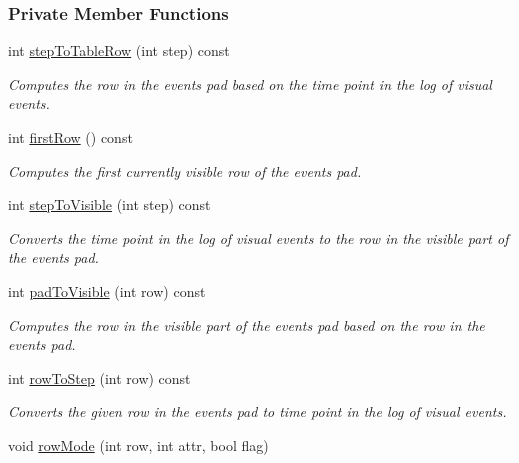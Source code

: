 \subsubsection*{Private Member Functions}
\begin{DoxyCompactItemize}
\item 
int \hyperlink{structslb_1_1core_1_1ui_1_1LogWindow_a2c53d380590b252c7686d8d114f09b10}{step\+To\+Table\+Row} (int step) const 
\begin{DoxyCompactList}\small\item\em Computes the row in the events pad based on the time point in the log of visual events. \end{DoxyCompactList}\item 
int \hyperlink{structslb_1_1core_1_1ui_1_1LogWindow_a748da227c77163215d00e3db45741344}{first\+Row} () const 
\begin{DoxyCompactList}\small\item\em Computes the first currently visible row of the events pad. \end{DoxyCompactList}\item 
int \hyperlink{structslb_1_1core_1_1ui_1_1LogWindow_a49e70f8d8c54722580e723905bcdec7a}{step\+To\+Visible} (int step) const 
\begin{DoxyCompactList}\small\item\em Converts the time point in the log of visual events to the row in the visible part of the events pad. \end{DoxyCompactList}\item 
int \hyperlink{structslb_1_1core_1_1ui_1_1LogWindow_a0a2d0540066c6a93a2181898958364a1}{pad\+To\+Visible} (int row) const 
\begin{DoxyCompactList}\small\item\em Computes the row in the visible part of the events pad based on the row in the events pad. \end{DoxyCompactList}\item 
int \hyperlink{structslb_1_1core_1_1ui_1_1LogWindow_af569fc1ee0a1898aee33ffdc24ee83c2}{row\+To\+Step} (int row) const 
\begin{DoxyCompactList}\small\item\em Converts the given row in the events pad to time point in the log of visual events. \end{DoxyCompactList}\item 
void \hyperlink{structslb_1_1core_1_1ui_1_1LogWindow_a99c5633c81cc37d911ca1176b8b9a3ca}{row\+Mode} (int row, int attr, bool flag)

\end{DoxyCompactItemize}
